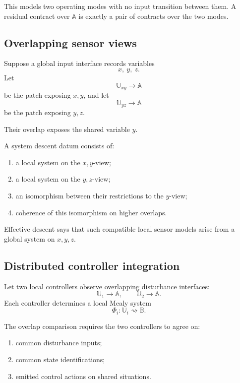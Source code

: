 This models two operating modes with no input transition between them. A
residual contract over \(\mathbb A\) is exactly a pair of contracts over the
two modes.

\subsection{Overlapping sensor views}
\label{subsec:example-overlapping-sensor-views}

Suppose a global input interface records variables
\[
    x,\ y,\ z.
\]
Let
\[
    \mathbb U_{xy}\to\mathbb A
\]
be the patch exposing \(x,y\), and let
\[
    \mathbb U_{yz}\to\mathbb A
\]
be the patch exposing \(y,z\).

Their overlap exposes the shared variable \(y\).

A system descent datum consists of:
\begin{enumerate}
    \item a local system on the \(x,y\)-view;
    \item a local system on the \(y,z\)-view;
    \item an isomorphism between their restrictions to the \(y\)-view;
    \item coherence of this isomorphism on higher overlaps.
\end{enumerate}

Effective descent says that such compatible local sensor models arise from a
global system on \(x,y,z\).

\subsection{Distributed controller integration}
\label{subsec:example-distributed-controller-integration}

Let two local controllers observe overlapping disturbance interfaces:
\[
    \mathbb U_1\to\mathbb A,
    \qquad
    \mathbb U_2\to\mathbb A.
\]
Each controller determines a local Mealy system
\[
    \Phi_i:\mathbb U_i\rightsquigarrow\mathbb B.
\]

The overlap comparison requires the two controllers to agree on:
\begin{enumerate}
    \item common disturbance inputs;
    \item common state identifications;
    \item emitted control actions on shared situations.
\end{enumerate}

